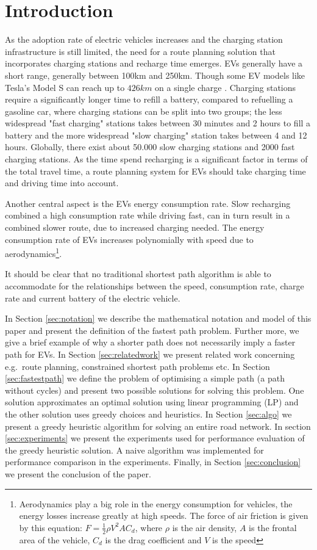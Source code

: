 \section{Introduction}

As the adoption rate of electric vehicles increases \cite{Henry2013} and the charging station infrastructure is still limited, the need for a route planning solution that incorporates charging stations and recharge time emerges. EVs generally have a short range, generally between 100km and 250km. Though some EV models like Tesla's Model S can reach up to $426\si{km}$ on a single charge \cite{teslacon}. Charging stations require a significantly longer time to refill a battery, compared to refuelling a gasoline car, where charging stations can be split into two groups; the less widespread "fast charging" stations takes between 30 minutes and 2 hours to fill a battery and the more widespread "slow charging" station takes between 4 and 12 hours. Globally, there exist about 50.000 slow charging stations and 2000 fast charging stations\cite{Globalevoutlook}. As the time spend recharging is a significant factor in terms of the total travel time, a route planning system for EVs should take charging time and driving time into account.

Another central aspect is the EVs energy consumption rate. Slow recharging combined a high consumption rate while driving fast, can in turn result in a combined slower route, due to increased charging needed. The energy consumption rate of EVs increases polynomially with speed due to aerodynamics\footnote{Aerodynamics play a big role in the energy consumption for vehicles, the energy losses increase greatly at high speeds. The force of air friction is given by this equation: $F = \frac{1}{2} \rho V^2 A C_d$, where $\rho$ is the air density, $A$ is the frontal area of the vehicle, $C_d$ is the drag coefficient and $V$ is the speed}.

It should be clear that no traditional shortest path algorithm is able to accommodate for the relationships between the speed, consumption rate, charge rate and current battery of the electric vehicle. 

In Section \ref{sec:notation} we describe the mathematical notation and model of this paper and present the definition of the fastest path problem. Further more, we give a brief example of why a shorter path does not necessarily imply a faster path for EVs. In Section \ref{sec:relatedwork} we present related work concerning e.g.\ route planning, constrained shortest path problems etc. In Section \ref{sec:fastestpath} we define the problem of optimising a simple path (a path without cycles) and present two possible solutions for solving this problem. One solution approximates an optimal solution using linear programming (LP) and the other solution uses greedy choices and heuristics. In Section \ref{sec:algo} we present a greedy heuristic algorithm for solving an entire road network. In section \ref{sec:experiments} we present the experiments used for performance evaluation of the greedy heuristic solution. A naive algorithm was implemented for performance comparison in the experiments. Finally, in Section \ref{sec:conclusion} we present the conclusion of the paper.    

